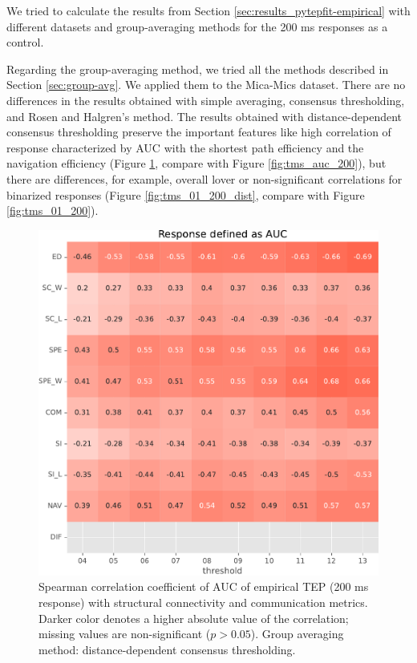 We tried to calculate the results from Section \ref{sec:results_pytepfit-empirical} with different datasets and group-averaging methods for the 200 ms responses as a control.  

Regarding the group-averaging method, we tried all the methods described in Section \ref{sec:group-avg}. We applied them to the Mica-Mics dataset. There are no differences in the results obtained with simple averaging, consensus thresholding, and Rosen and Halgren's method. The results obtained with distance-dependent consensus thresholding preserve the important features like high correlation of response characterized by AUC with the shortest path efficiency and the navigation efficiency (Figure \ref{fig:tms_auc_200_dist}, compare with Figure \ref{fig:tms_auc_200}), but there are differences, for example, overall lover or non-significant correlations for binarized responses (Figure \ref{fig:tms_01_200_dist}, compare with Figure \ref{fig:tms_01_200}).

\begin{figure}
    \centering
    \includegraphics[width=\textwidth]{images/nootebook_generated/tmseeg_results/empirical/200/not_over_threshold_nan/Mica-Mics_dist/Response defined as AUC.pdf}
    \caption[TEPs AUC (200 ms) correlations (dist)]{Spearman correlation coefficient of AUC of empirical TEP (200 ms response) with structural connectivity and communication metrics. Darker color denotes a higher absolute value of the correlation; missing values are non-significant ($p>0.05$). Group averaging method: distance-dependent consensus thresholding.}
    \label{fig:tms_auc_200_dist}
\end{figure}

